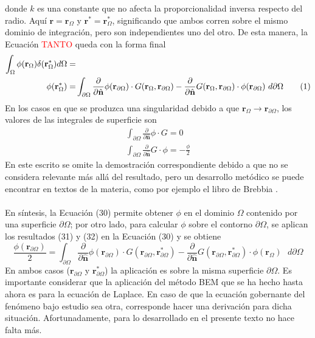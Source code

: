 \documentclass[12pt, notitlepage]{article}
\newcommand\numberthis{\addtocounter{equation}{1}\tag{\theequation}}
\numberwithin{equation}{section}
\begin{document}
donde $k$ es una constante que no afecta la proporcionalidad inversa respecto del radio. Aquí $\mathbf{r} = \mathbf{r}_\Omega$ y $\mathbf{r}^* = \mathbf{r}_\Omega^*$, significando que ambos corren sobre el mismo dominio de integración, pero son independientes uno del otro. De esta manera, la Ecuación \textcolor{red}{TANTO} queda con la forma final
\begin{align*}
\int_\Omega\phi(\mathbf{r}_\Omega)\delta(\mathbf{r}_\Omega^*)d\Omega=&\\
\phi(\mathbf{r}_\Omega^*)=&\int_{\partial\Omega}\frac{\partial}{\partial\hat{\mathbf{n}}}\phi(\mathbf{r}_{\partial\Omega})\cdot G(\mathbf{r}_\Omega,\mathbf{r}_{\partial\Omega}) - \frac{\partial}{\partial\hat{\mathbf{n}}}G(\mathbf{r}_\Omega,\mathbf{r}_{\partial\Omega})\cdot\phi(\mathbf{r}_{\partial\Omega})\text{ }d\partial\Omega \numberthis
\end{align*}
En los casos en que se produzca una singularidad debido a que $\mathbf{r}_\Omega \rightarrow \mathbf{r}_{\partial\Omega}$, los valores de las integrales de superficie son
\begin{gather}
\int_{\partial\Omega}\frac{\partial}{\partial\hat{\mathbf{n}}}\phi\cdot G = 0\\
\int_{\partial\Omega}\frac{\partial}{\partial\hat{\mathbf{n}}} G\cdot\phi = -\frac{\phi}{2}
\end{gather}
En este escrito se omite la demostración correspondiente debido a que no se considera relevante más allá del resultado, pero un desarrollo metódico se puede encontrar en textos de la materia, como por ejemplo el libro de Brebbia \cite{Brebbia}.\\\\
En síntesis, la Ecuación (30) permite obtener $\phi$ en el dominio $\Omega$ contenido por una superficie $\partial\Omega$; por otro lado, para calcular $\phi$ sobre el contorno $\partial\Omega$, se aplican los resultados (31) y (32) en la Ecuación (30) y se obtiene
\begin{equation}
\frac{\phi(\mathbf{r}_{\partial\Omega})}{2} = \int_{\partial\Omega}\frac{\partial}{\partial\hat{\mathbf{n}}}\phi(\mathbf{r}_{\partial\Omega})\cdot G(\mathbf{r}_{\partial\Omega},\mathbf{r}_{\partial\Omega}^*) - \frac{\partial}{\partial\hat{\mathbf{n}}}G(\mathbf{r}_{\partial\Omega},\mathbf{r}_{\partial\Omega}^*)\cdot\phi(\mathbf{r}_\Omega)\text{ }d\partial\Omega
\end{equation}
En ambos casos ($\mathbf{r}_{\partial\Omega}$ y $\mathbf{r}_{\partial\Omega}^*$) la aplicación es sobre la misma superficie $\partial\Omega$. Es importante considerar que la aplicación del método BEM que se ha hecho hasta ahora es para la ecuación de Laplace. En caso de que la ecuación gobernante del fenómeno bajo estudio sea otra, corresponde hacer una derivación para dicha situación. Afortunadamente, para lo desarrollado en el presente texto no hace falta más.
\end{document}
